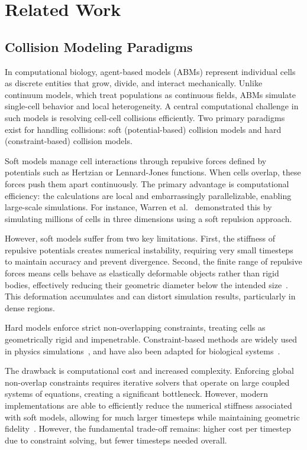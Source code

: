 \documentclass[conference]{IEEEtran}
\begin{document}
\section{Related Work}

\subsection{Collision Modeling Paradigms}

In computational biology, agent-based models (ABMs) represent individual cells as discrete entities that grow, divide, and interact mechanically. Unlike continuum models, which treat populations as continuous fields, ABMs simulate single-cell behavior and local heterogeneity. A central computational challenge in such models is resolving cell-cell collisions efficiently. Two primary paradigms exist for handling collisions: soft (potential-based) collision models and hard (constraint-based) collision models.

\begin{description}[style=nextline]
    \item[Soft (Potential-Based) Models]
        Soft models manage cell interactions through repulsive forces defined by potentials such as Hertzian or Lennard-Jones functions. When cells overlap, these forces push them apart continuously. The primary advantage is computational efficiency: the calculations are local and embarrassingly parallelizable, enabling large-scale simulations. For instance, Warren et al.~\cite{Warren2019} demonstrated this by simulating millions of cells in three dimensions using a soft repulsion approach.

        However, soft models suffer from two key limitations. First, the stiffness of repulsive potentials creates numerical instability, requiring very small timesteps to maintain accuracy and prevent divergence. Second, the finite range of repulsive forces means cells behave as elastically deformable objects rather than rigid bodies, effectively reducing their geometric diameter below the intended size~\cite{Yan2019}. This deformation accumulates and can distort simulation results, particularly in dense regions.

    \item[Hard (Constraint-Based) Models]
        Hard models enforce strict non-overlapping constraints, treating cells as geometrically rigid and impenetrable. Constraint-based methods are widely used in physics simulations~\cite{Tasora2008,Macklin2014,Li2021,Ferguson2021}, and have also been adapted for biological systems~\cite{Rudge2012,Weady2024,Yan2019}.

        The drawback is computational cost and increased complexity. Enforcing global non-overlap constraints requires iterative solvers that operate on large coupled systems of equations, creating a significant bottleneck. However, modern implementations are able to efficiently reduce the numerical stiffness associated with soft models, allowing for much larger timesteps while maintaining geometric fidelity~\cite{Yan2019}. However, the fundamental trade-off remains: higher cost per timestep due to constraint solving, but fewer timesteps needed overall.
\end{description}
\end{document}
